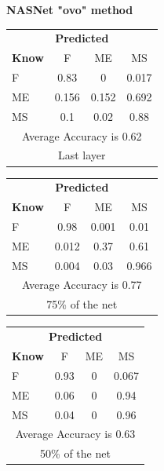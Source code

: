 \documentclass[12pt]{article} %
\begin{document}
\begin{center}
\textbf{NASNet "ovo" method}
\end{center}
\begin{minipage}{0.5\textwidth}
\begin{center}
\begin{tabular}{l|c|c|c|}
 \multicolumn{4}{c}{ \textbf{ Predicted}}\\
 \textbf{Know}&F&ME&MS\\ \hline\hline
F   &0.83&0&0.017\\
ME &0.156&0.152&0.692\\
MS &0.1&0.02&0.88\\
\multicolumn{4}{c}{Average Accuracy is 0.62}\\
\multicolumn{4}{c}{Last layer}\\
\end{tabular}
\end{center}
\end{minipage}
\begin{minipage}{0.5\textwidth}
\begin{center}
\begin{tabular}{l|c|c|c|}
 \multicolumn{4}{c}{ \textbf{ Predicted}}\\
 \textbf{Know}&F&ME&MS\\ \hline\hline
F    &0.98&0.001&0.01\\
ME &0.012&0.37&0.61\\
MS &0.004&0.03&0.966\\
\multicolumn{4}{c}{Average Accuracy is 0.77}\\
\multicolumn{4}{c}{75\%  of the net}\\
\end{tabular}
\end{center}
\end{minipage}
\begin{minipage}{0.5\textwidth}
\begin{center}
\begin{tabular}{l|c|c|c|}
 \multicolumn{4}{c}{ \textbf{ Predicted}}\\
 \textbf{Know}&F&ME&MS\\ \hline\hline
F   &0.93&0&0.067\\
ME &0.06&0&0.94\\
MS &0.04&0&0.96\\
\multicolumn{4}{c}{Average Accuracy is 0.63}\\
\multicolumn{4}{c}{50\%  of the net}\\
\end{tabular}
\end{center}
\end{minipage}
\end{document}
